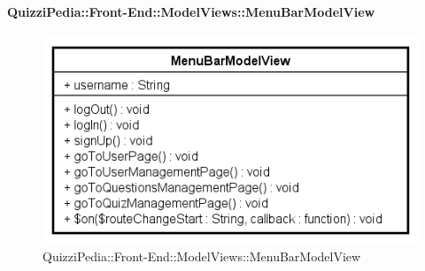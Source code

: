 \paragraph{QuizziPedia::Front-End::ModelViews::MenuBarModelView}

\label{QuizziPedia::Front-End::ModelViews::MenuBarModelView}

\begin{figure}[ht]
	\centering
	\includegraphics[scale=0.5,keepaspectratio]{UML/Classi/Front-End/QuizziPedia_Front-end_ModelView_MenuBarModelView.png}
	\caption{QuizziPedia::Front-End::ModelViews::MenuBarModelView}
\end{figure} \FloatBarrier

